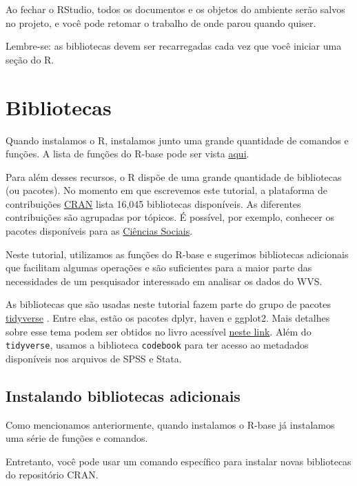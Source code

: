 \documentclass[
  10pt,
  brazil,
  a4paper,
  twoside, notitlepage, openright]{book}
\begin{document}
Ao fechar o RStudio, todos os documentos e os objetos do ambiente serão salvos no projeto, e você pode retomar o trabalho de onde parou quando quiser.

Lembre-se: as bibliotecas devem ser recarregadas cada vez que você iniciar uma seção do R.

\hypertarget{biblio}{%
\chapter{Bibliotecas}\label{biblio}}

Quando instalamos o R, instalamos junto uma grande quantidade de comandos e funções. A lista de funções do R-base pode ser vista \href{https://stat.ethz.ch/R-manual/R-devel/library/base/html/00Index.html}{aqui}.

Para além desses recursos, o R dispõe de uma grande quantidade de bibliotecas (ou pacotes). No momento em que escrevemos este tutorial, a plataforma de contribuições \href{https://cran.r-project.org/web/packages/}{CRAN} lista 16,045 bibliotecas disponíveis. As diferentes contribuições são agrupadas por tópicos. É possível, por exemplo, conhecer os pacotes disponíveis para as \href{https://cran.r-project.org/web/views/SocialSciences.html}{Ciências Sociais}.

Neste tutorial, utilizamos as funções do R-base e sugerimos bibliotecas adicionais que facilitam algumas operações e são suficientes para a maior parte das necessidades de um pesquisador interessado em analisar os dados do WVS.

As bibliotecas que são usadas neste tutorial fazem parte do grupo de pacotes \href{https://www.tidyverse.org/}{tidyverse} \citeyearpar{R-tidyverse}. Entre elas, estão os pacotes dplyr, haven e ggplot2. Mais detalhes sobre esse tema podem ser obtidos no livro acessível \href{https://r4ds.had.co.nz/}{neste link}. Além do \texttt{tidyverse}, usamos a biblioteca \texttt{codebook} para ter acesso ao metadados disponíveis nos arquivos de SPSS e Stata.

\hypertarget{instalando-bibliotecas-adicionais}{%
\section{Instalando bibliotecas adicionais}\label{instalando-bibliotecas-adicionais}}

Como mencionamos anteriormente, quando instalamos o R-base já instalamos uma série de funções e comandos.

Entretanto, você pode usar um comando específico para instalar novas bibliotecas do repositório CRAN.
\end{document}
